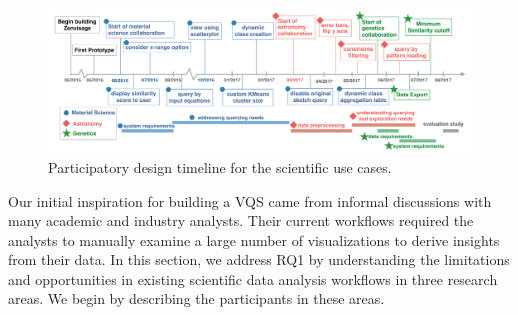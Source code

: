 \begin{figure}[!ht]
\centering
\captionsetup{justification=centering,margin=2cm}
\vspace{-10pt}
\includegraphics[width=6in]{figures/timeline_new.pdf}
\vspace{-6pt}\caption{Participatory design timeline for the scientific use cases.}
\label{timeline}
\vspace{-10pt}
\end{figure}
\par Our initial inspiration for building a VQS came from informal discussions with many academic and industry analysts. Their current workflows required the analysts to manually examine a large number of visualizations to derive insights from their data. In this section, we address RQ1 by understanding the limitations and opportunities in existing scientific data analysis workflows in three research areas. We begin by describing the participants in these areas.
